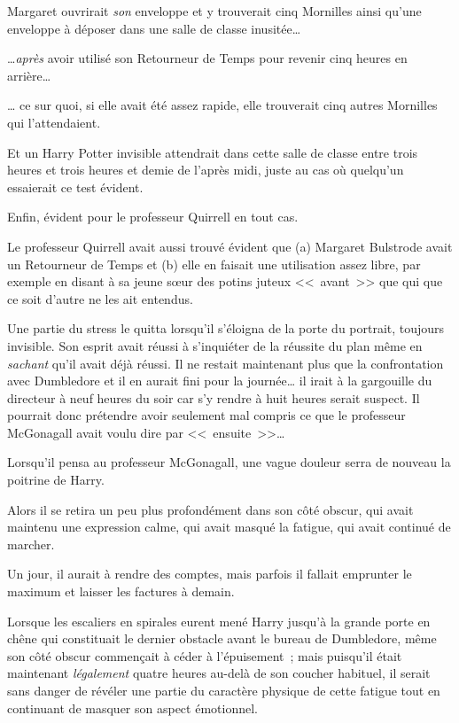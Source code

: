 Margaret ouvrirait \emph{son} enveloppe et y trouverait cinq Mornilles ainsi qu'une enveloppe à déposer dans une salle de classe inusitée…

…\emph{après} avoir utilisé son Retourneur de Temps pour revenir cinq heures en arrière…

… ce sur quoi, si elle avait été assez rapide, elle trouverait cinq autres Mornilles qui l'attendaient.

Et un Harry Potter invisible attendrait dans cette salle de classe entre trois heures et trois heures et demie de l'après midi, juste au cas où quelqu'un essaierait ce test évident.

Enfin, évident pour le professeur Quirrell en tout cas.

Le professeur Quirrell avait aussi trouvé évident que (a) Margaret Bulstrode avait un Retourneur de Temps et (b) elle en faisait une utilisation assez libre, par exemple en disant à sa jeune sœur des potins juteux <<~avant~>> que qui que ce soit d'autre ne les ait entendus.

Une partie du stress le quitta lorsqu'il s'éloigna de la porte du portrait, toujours invisible. Son esprit avait réussi à s'inquiéter de la réussite du plan même en \emph{sachant} qu'il avait déjà réussi. Il ne restait maintenant plus que la confrontation avec Dumbledore et il en aurait fini pour la journée… il irait à la gargouille du directeur à neuf heures du soir car s'y rendre à huit heures serait suspect. Il pourrait donc prétendre avoir seulement mal compris ce que le professeur McGonagall avait voulu dire par <<~ensuite~>>…

Lorsqu'il pensa au professeur McGonagall, une vague douleur serra de nouveau la poitrine de Harry.

Alors il se retira un peu plus profondément dans son côté obscur, qui avait maintenu une expression calme, qui avait masqué la fatigue, qui avait continué de marcher.

Un jour, il aurait à rendre des comptes, mais parfois il fallait emprunter le maximum et laisser les factures à demain.

\later

Lorsque les escaliers en spirales eurent mené Harry jusqu'à la grande porte en chêne qui constituait le dernier obstacle avant le bureau de Dumbledore, même son côté obscur commençait à céder à l'épuisement~; mais puisqu'il était maintenant \emph{légalement} quatre heures au-delà de son coucher habituel, il serait sans danger de révéler une partie du caractère physique de cette fatigue tout en continuant de masquer son aspect émotionnel.

